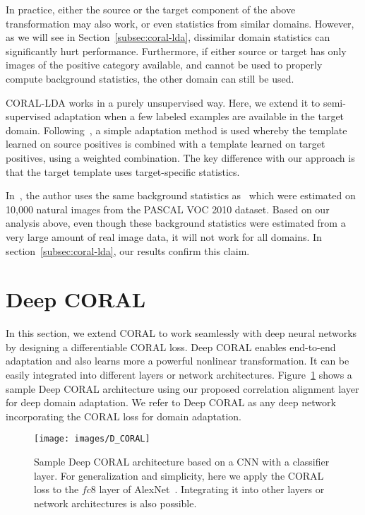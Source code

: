 \documentclass[graybox]{svmult}
\begin{document}
In practice, either the source or the target component of the above transformation may also work, or even statistics from similar domains. However, as we will see in Section~\ref{subsec:coral-lda}, dissimilar domain statistics can significantly hurt performance. Furthermore, if either source or target has only images of the positive category available, and cannot be used to properly compute background statistics, the other domain can still be used.

CORAL-LDA works in a purely unsupervised way. Here, we extend it to semi-supervised adaptation when a few labeled examples are available in the target domain. Following~\cite{ICRA14}, a simple adaptation method is used whereby the template learned on source positives is combined with a template learned on target positives, using a weighted combination. The key difference with our approach is that the target template uses target-specific statistics.

In~\cite{ICRA14}, the author uses the same background statistics as~\cite{who} which were estimated on 10,000 natural images from the PASCAL VOC 2010 dataset. Based on our analysis above, even though these background statistics were estimated from a very large amount of real image data, it will not work for all domains. In section~\ref{subsec:coral-lda}, our results confirm this claim. \section{Deep CORAL}
\label{sec:dcoral}
In this section, we extend CORAL to work seamlessly with deep neural networks by designing a differentiable CORAL loss. Deep CORAL enables end-to-end adaptation and also learns more a powerful nonlinear transformation. It can be easily integrated into different layers or network architectures. Figure~\ref{fig:d-coral} shows a sample Deep CORAL architecture using our proposed correlation alignment layer for deep domain adaptation. We refer to Deep CORAL as any deep network incorporating the CORAL loss for domain adaptation. 

\begin{figure}[t]
\centering
\texttt{[image: images/D\_CORAL]}
\caption{\small Sample Deep CORAL architecture based on a CNN with a classifier layer. For generalization and simplicity, here we apply the CORAL loss to the $fc8$ layer of AlexNet~\cite{alexnet}. Integrating it into other layers or network architectures is also possible.}
\label{fig:d-coral}
\end{figure}
\end{document}
